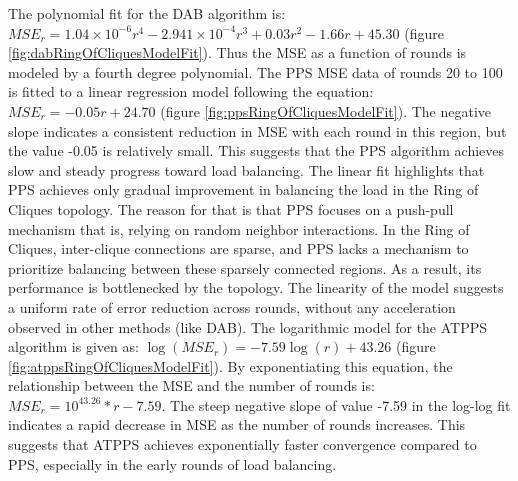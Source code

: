 The polynomial fit for the DAB algorithm is: $MSE_r=1.04\times 10^{-6}r^{4}-2.941\times 10^{-4}r^{3}+0.03r^{2}-1.66r+45.30$ (figure \ref{fig:dabRingOfCliquesModelFit}). Thus the MSE as a function of rounds is modeled by a fourth degree polynomial. The PPS MSE data of rounds 20 to 100 is fitted to a linear regression model following the equation: $MSE_r=-0.05r+24.70$ (figure \ref{fig:ppsRingOfCliquesModelFit}). The negative slope indicates a consistent reduction in MSE with each round in this region, but the value -0.05 is relatively small. This suggests that the PPS algorithm achieves slow and steady progress toward load balancing. The linear fit highlights that PPS achieves only gradual improvement in balancing the load in the Ring of Cliques topology. The reason for that is that PPS focuses on a push-pull mechanism that is, relying on random neighbor interactions. In the Ring of Cliques, inter-clique connections are sparse, and PPS lacks a mechanism to prioritize balancing between these sparsely connected regions. As a result, its performance is bottlenecked by the topology. The linearity of the model suggests a uniform rate of error reduction across rounds, without any acceleration observed in other methods (like DAB). The logarithmic model for the ATPPS algorithm is given as:
$\log{(MSE_r)}=-7.59\log{(r)}+43.26$ (figure \ref{fig:atppsRingOfCliquesModelFit}). By exponentiating this equation, the relationship between the MSE and the number of rounds is: $MSE_r=10^{43.26}*r-7.59$. The steep negative slope of value -7.59 in the log-log fit indicates a rapid decrease in MSE as the number of rounds increases. This suggests that ATPPS achieves exponentially faster convergence compared to PPS, especially in the early rounds of load balancing.

